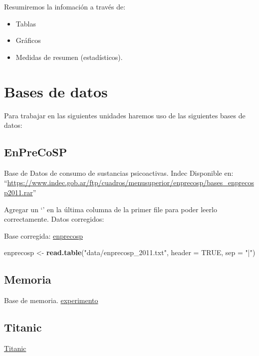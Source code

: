 \documentclass[spanish,]{book}
\newenvironment{Shaded}{\begin{snugshade}}{\end{snugshade}}
\newcommand{\KeywordTok}[1]{\textcolor[rgb]{0.13,0.29,0.53}{\textbf{#1}}}
\newcommand{\DataTypeTok}[1]{\textcolor[rgb]{0.13,0.29,0.53}{#1}}
\newcommand{\StringTok}[1]{\textcolor[rgb]{0.31,0.60,0.02}{#1}}
\newcommand{\OtherTok}[1]{\textcolor[rgb]{0.56,0.35,0.01}{#1}}
\newcommand{\NormalTok}[1]{#1}
\providecommand{\tightlist}{%
  \setlength{\itemsep}{0pt}\setlength{\parskip}{0pt}}
\begin{document}
Resumiremos la infomación a través de:

\begin{itemize}
\tightlist
\item
  Tablas
\item
  Gráficos
\item
  Medidas de resumen (estadísticos).
\end{itemize}

\chapter{Bases de datos}\label{bases-de-datos}

Para trabajar en las siguientes unidades haremos uso de las siguientes
bases de datos:

\section{EnPreCoSP}\label{enprecosp}

Base de Datos de consumo de sustancias psicoactivas. Indec Disponible
en:
``\url{https://www.indec.gob.ar/ftp/cuadros/menusuperior/enprecosp/bases_enprecosp2011.rar}''

Agregar un `\textbar{}' en la última columna de la primer file para
poder leerlo correctamente. Datos corregidos:

Base corregida: \href{data/enprecosp_2011.txt}{enprecosp}

\begin{Shaded}
\begin{Highlighting}[]
\NormalTok{enprecosp <-}\StringTok{ }\KeywordTok{read.table}\NormalTok{(}\StringTok{"data/enprecosp_2011.txt"}\NormalTok{, }\DataTypeTok{header =} \OtherTok{TRUE}\NormalTok{, }\DataTypeTok{sep =} \StringTok{"|"}\NormalTok{)}
\end{Highlighting}
\end{Shaded}

\section{Memoria}\label{memoria}

Base de memoria. \href{data/EXP1.xls}{experimento}

\section{Titanic}\label{titanic}

\href{data/titanic.csv}{Titanic}
\end{document}

